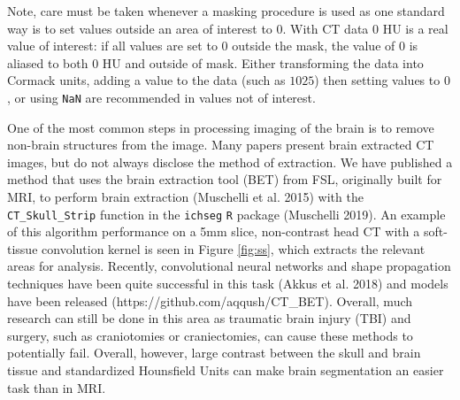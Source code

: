 \documentclass[]{elsarticle} %
\begin{document}
Note, care must be taken whenever a masking procedure is used as one standard way is to set values outside an area of interest to \(0\). With CT data \(0\) HU is a real value of interest: if all values are set to \(0\) outside the mask, the value of \(0\) is aliased to both \(0\) HU and outside of mask. Either transforming the data into Cormack units, adding a value to the data (such as \(1025\)) then setting values to \(0\), or using \texttt{NaN} are recommended in values not of interest.

One of the most common steps in processing imaging of the brain is to remove non-brain structures from the image. Many papers present brain extracted CT images, but do not always disclose the method of extraction. We have published a method that uses the brain extraction tool (BET) from FSL, originally built for MRI, to perform brain extraction (Muschelli et al. 2015) with the \texttt{CT\_Skull\_Strip} function in the \texttt{ichseg} \texttt{R} package (Muschelli 2019). An example of this algorithm performance on a 5mm slice, non-contrast head CT with a soft-tissue convolution kernel is seen in Figure \ref{fig:ss}, which extracts the relevant areas for analysis. Recently, convolutional neural networks and shape propagation techniques have been quite successful in this task (Akkus et al. 2018) and models have been released (https://github.com/aqqush/CT\_BET). Overall, much research can still be done in this area as traumatic brain injury (TBI) and surgery, such as craniotomies or craniectomies, can cause these methods to potentially fail. Overall, however, large contrast between the skull and brain tissue and standardized Hounsfield Units can make brain segmentation an easier task than in MRI.
\end{document}
